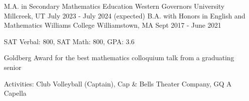 \begin{cventries}
  \cventry
    {M.A. in Secondary Mathematics Education}
    {Western Governors University}
    {Millcreek, UT}
    {July 2023 - July 2024 (expected)}
    {}
  \cventry
    {B.A. with Honors in English and Mathematics}
    {Williams College}
    {Williamstown, MA}
    {Sept 2017 - June 2021}
    {
    \begin{cvitems}
      \item {SAT Verbal: 800, SAT Math: 800, GPA: 3.6}
      \item {Goldberg Award for the best mathematics colloquium talk from a graduating senior}
      \item {Activities: Club Volleyball (Captain), Cap \& Bells Theater Company, GQ A Capella}
    \end{cvitems}
    }
\end{cventries}
